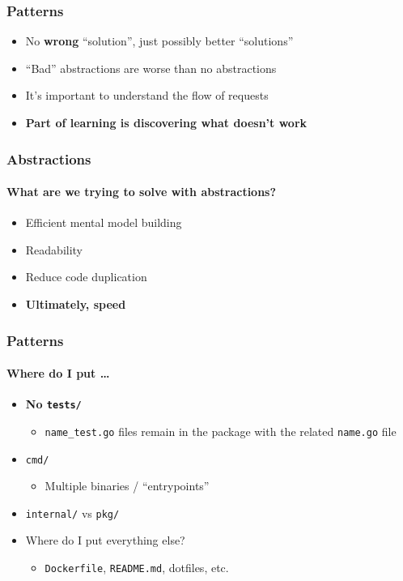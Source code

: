 
\begin{frame}[fragile]
  \frametitle{Patterns}
  \begin{itemize}
    \item No \textbf{wrong} ``solution'', just possibly better ``solutions''
    \pause
    \item ``Bad'' abstractions are worse than no abstractions
    \pause
    \item It's important to understand the flow of requests
    \pause
    \item \textbf{Part of learning is discovering what doesn't work}
  \end{itemize}
\end{frame}

{
  \color{solarizedBase2}
\begin{frame}[fragile]
  \frametitle{Abstractions}
  \framesubtitle{What are we trying to solve with abstractions?}

  \begin{itemize}
    \item Efficient mental model building
    \item Readability
    \item Reduce code duplication
    \item \textbf{Ultimately, speed}
  \end{itemize}
\end{frame}
}

\begin{frame}[fragile]
  \frametitle{Patterns}
  \framesubtitle{Where do I put \dots}

  \begin{itemize}
    \item{\textbf{No \texttt{tests/}}}
    \begin{itemize}
      \item \texttt{name\_test.go} files remain in the package with the related \texttt{name.go} file
    \end{itemize}
    \item \texttt{cmd/}
      \begin{itemize}
        \item Multiple binaries / ``entrypoints''
      \end{itemize}
    \item \texttt{internal/} vs \texttt{pkg/}
    \item Where do I put everything else?
      \begin{itemize}
        \item \texttt{Dockerfile}, \texttt{README.md}, dotfiles, etc.
      \end{itemize}
  \end{itemize}
\end{frame}

